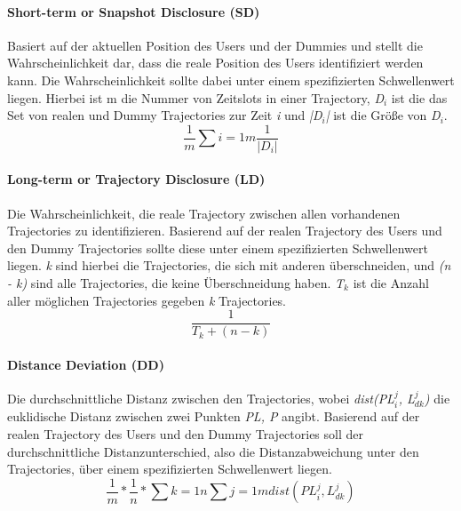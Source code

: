 	\paragraph{Short-term or Snapshot Disclosure (SD)} Basiert auf der aktuellen Position des Users und der Dummies und stellt die Wahrscheinlichkeit dar, dass die reale Position des Users identifiziert werden kann. Die Wahrscheinlichkeit sollte dabei unter einem spezifizierten Schwellenwert liegen. Hierbei ist m die Nummer von Zeitslots in einer Trajectory, \textit{D$_{i}$} ist die das Set von realen und Dummy Trajectories zur Zeit \textit{i} und \textit{|D$_{i}$|} ist die Größe von \textit{D$_{i}$}.
	\begin{equation}
	\label{equation:SD}
	\frac{1}{m} \sum{i=1}{m}{\frac{1}{\left\lvert D_{i} \right\rvert}}
	\end{equation}	
	
	\paragraph{Long-term or Trajectory Disclosure (LD)} Die Wahrscheinlichkeit, die reale Trajectory zwischen allen vorhandenen Trajectories zu identifizieren. Basierend auf der realen Trajectory des Users und den Dummy Trajectories sollte diese unter einem spezifizierten Schwellenwert liegen. \textit{k} sind hierbei die Trajectories, die sich mit anderen überschneiden, und \textit{(n - k)} sind alle Trajectories, die keine Überschneidung haben. \textit{T$_{k}$} ist die Anzahl aller möglichen Trajectories gegeben \textit{k} Trajectories.
	\begin{equation}
	\label{equation:LD}
	\frac{1}{T_{k} + \left( n - k \right)}
	\end{equation}	
	
	\paragraph{Distance Deviation (DD)} Die durchschnittliche Distanz zwischen den Trajectories, wobei \textit{dist(PL$_{i}^{j}$, L$_{dk}^{j}$)} die euklidische Distanz zwischen zwei Punkten \textit{PL, P} angibt. Basierend auf der realen Trajectory des Users und den Dummy Trajectories soll der durchschnittliche Distanzunterschied, also die Distanzabweichung unter den Trajectories, über einem spezifizierten Schwellenwert liegen.
	\begin{equation}
	\label{equation:DD}
	\frac{1}{m} * \frac{1}{n} * \sum{k=1}{n}{\sum{j=1}{m}{dist\left(PL_{i}^{j}, L_{dk}^{j}\right)}}
	\end{equation}	

